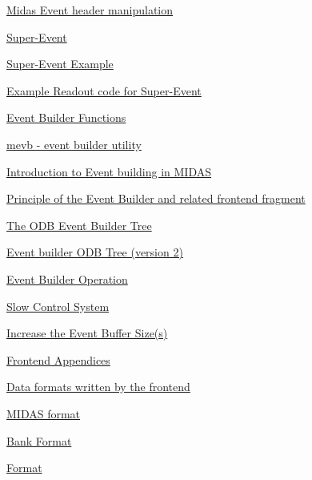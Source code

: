 \begin{TabularC}{2}
\begin{TabularC}{2}
\begin{DoxyItemize}
\begin{DoxyItemize}
\begin{DoxyItemize}
\begin{DoxyItemize}
\item \hyperlink{FE_bank_construction_FE_Midas_Event_Header_Manipulation}{Midas Event header manipulation} 
\end{DoxyItemize}
\end{DoxyItemize}
\item \hyperlink{FE_Super_Event}{Super-\/Event} 
\begin{DoxyItemize}
\item \hyperlink{FE_Super_Event_FE_Super_Event_example}{Super-\/Event Example} 
\item \hyperlink{FE_Super_Event_FE_Super_Event_readout}{Example Readout code for Super-\/Event} 
\end{DoxyItemize}
\item \hyperlink{FE_Event_Builder}{Event Builder Functions} 
\begin{DoxyItemize}
\item \hyperlink{FE_Event_Builder_FE_mevb_utility}{mevb -\/ event builder utility} 
\item \hyperlink{FE_Event_Builder_FE_eb}{Introduction to Event building in MIDAS} 
\item \hyperlink{FE_Event_Builder_FE_principle_eb}{Principle of the Event Builder and related frontend fragment} 
\item \hyperlink{FE_Event_Builder_FE_ODB_EBuilder_Tree}{The ODB Event Builder Tree} 
\item \hyperlink{FE_Event_Builder_FE_eb_tree_2}{Event builder ODB Tree (version 2)} 
\item \hyperlink{FE_Event_Builder_FE_eb_Operation}{Event Builder Operation} 
\end{DoxyItemize}
\item \hyperlink{FE_Slow_Control_system}{Slow Control System} 
\item \hyperlink{FE_event_buffer_size}{Increase the Event Buffer Size(s)} 
\item \hyperlink{FE_Appendices}{Frontend Appendices} 
\begin{DoxyItemize}
\item \hyperlink{FE_Data_format}{Data formats written by the frontend} 
\begin{DoxyItemize}
\item \hyperlink{FE_Data_format_FE_Midas_format}{MIDAS format} 
\begin{DoxyItemize}
\item \hyperlink{FE_Data_format_FE_Bank_Format}{Bank Format} 
\item \hyperlink{FE_Data_format_Tape}{Format} 

\end{DoxyItemize}
\end{DoxyItemize}
\end{DoxyItemize}
\end{DoxyItemize}
\end{DoxyItemize}
\end{TabularC}
\end{TabularC}

